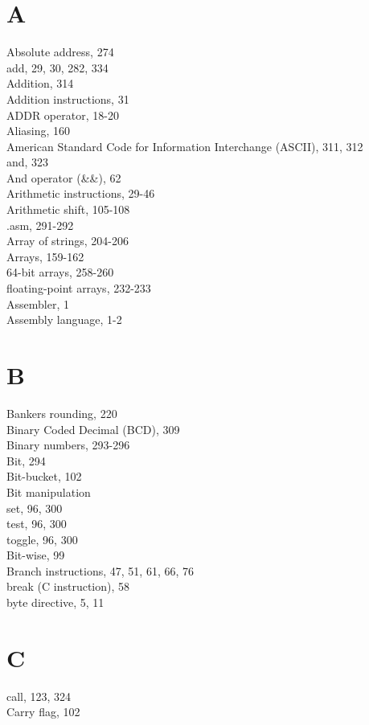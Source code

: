 \documentclass[10pt]{article}
\begin{document}
\section*{A}
Absolute address, 274\\
add, 29, 30, 282, 334\\
Addition, 314\\
Addition instructions, 31\\
ADDR operator, 18-20\\
Aliasing, 160\\
American Standard Code for Information Interchange (ASCII), 311, 312\\
and, 323\\
And operator (\&\&), 62\\
Arithmetic instructions, 29-46\\
Arithmetic shift, 105-108\\
.asm, 291-292\\
Array of strings, 204-206\\
Arrays, 159-162\\
64-bit arrays, 258-260\\
floating-point arrays, 232-233\\
Assembler, 1\\
Assembly language, 1-2

\section*{B}
Bankers rounding, 220\\
Binary Coded Decimal (BCD), 309\\
Binary numbers, 293-296\\
Bit, 294\\
Bit-bucket, 102\\
Bit manipulation\\
set, 96, 300\\
test, 96, 300\\
toggle, 96, 300\\
Bit-wise, 99\\
Branch instructions, 47, 51, 61, 66, 76\\
break (C instruction), 58\\
byte directive, 5, 11

\section*{C}
call, 123, 324\\
Carry flag, 102
\end{document}
